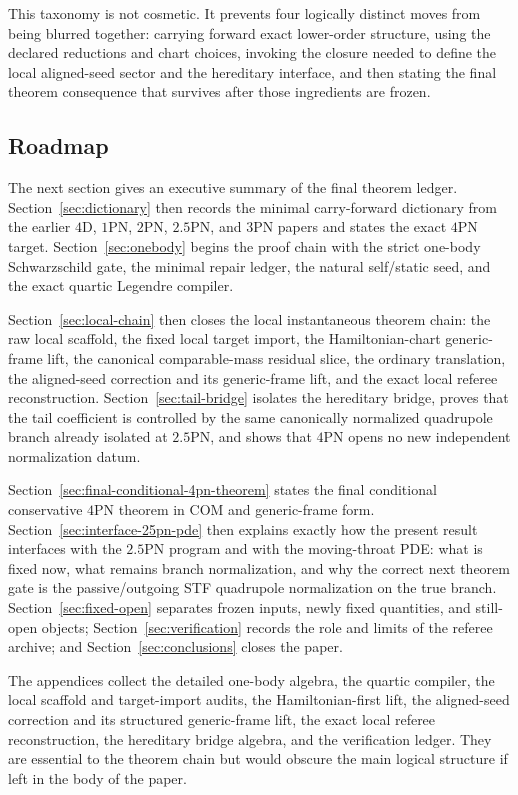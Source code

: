 \documentclass[11pt]{article}
\begin{document}
This taxonomy is not cosmetic.  It prevents four logically distinct moves from
being blurred together: carrying forward exact lower-order structure, using the
declared reductions and chart choices, invoking the closure needed to define the
local aligned-seed sector and the hereditary interface, and then stating the
final theorem consequence that survives after those ingredients are frozen.

\subsection{Roadmap}
\label{sec:intro-roadmap}

The next section gives an executive summary of the final theorem ledger.
Section~\ref{sec:dictionary} then records the minimal carry-forward dictionary
from the earlier $4$D, $1$PN, $2$PN, $2.5$PN, and $3$PN papers and states the
exact $4$PN target.  Section~\ref{sec:onebody} begins the proof chain with the
strict one-body Schwarzschild gate, the minimal repair ledger, the natural
self/static seed, and the exact quartic Legendre compiler.

Section~\ref{sec:local-chain} then closes the local instantaneous theorem chain:
the raw local scaffold, the fixed local target import, the Hamiltonian-chart
generic-frame lift, the canonical comparable-mass residual slice, the ordinary
translation, the aligned-seed correction and its generic-frame lift, and the
exact local referee reconstruction.  Section~\ref{sec:tail-bridge} isolates the
hereditary bridge, proves that the tail coefficient is controlled by the same
canonically normalized quadrupole branch already isolated at $2.5$PN, and shows
that $4$PN opens no new independent normalization datum.

Section~\ref{sec:final-conditional-4pn-theorem} states the final conditional conservative $4$PN
theorem in COM and generic-frame form.  Section~\ref{sec:interface-25pn-pde}
then explains exactly how the present result interfaces with the $2.5$PN program
and with the moving-throat PDE: what is fixed now, what remains branch
normalization, and why the correct next theorem gate is the passive/outgoing STF
quadrupole normalization on the true branch.  Section~\ref{sec:fixed-open}
separates frozen inputs, newly fixed quantities, and still-open objects;
Section~\ref{sec:verification} records the role and limits of the referee
archive; and Section~\ref{sec:conclusions} closes the paper.

The appendices collect the detailed one-body algebra, the quartic compiler, the
local scaffold and target-import audits, the Hamiltonian-first lift, the
aligned-seed correction and its structured generic-frame lift, the exact local
referee reconstruction, the hereditary bridge algebra, and the verification
ledger.  They are essential to the theorem chain but would obscure the main
logical structure if left in the body of the paper.
\end{document}
